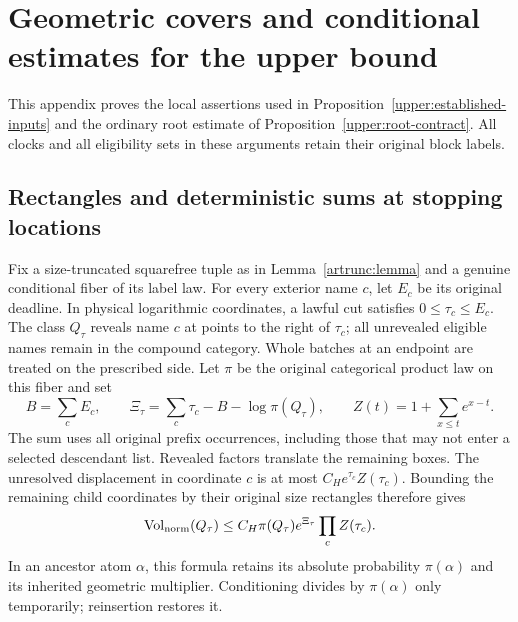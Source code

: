 \section{Geometric covers and conditional estimates for the upper bound}
\label{app:upper-details}

This appendix proves the local assertions used in
Proposition~\ref{upper:established-inputs} and the ordinary root estimate
of Proposition~\ref{upper:root-contract}. All clocks and all eligibility
sets in these arguments retain their original block labels.

\subsection{Rectangles and deterministic sums at stopping locations}
\label{updetail:rectangles}
Fix a size-truncated squarefree tuple as in Lemma~\ref{artrunc:lemma}
and a genuine conditional fiber of its label law. For every exterior
name $c$, let $E_c$ be its original deadline. In physical logarithmic
coordinates, a lawful cut satisfies $0\leq\tau_c\leq E_c$.
The class $Q_\tau$ reveals name $c$ at points to the right of $\tau_c$;
all unrevealed eligible names remain in the compound category. Whole
batches at an endpoint are treated on the prescribed side. Let $\pi$
be the original categorical product law on this fiber and set
\[
 B=\sum_cE_c,\qquad
 \Xi_\tau=\sum_c\tau_c-B-\log\pi(Q_\tau),\qquad
 Z(t)=1+\sum_{x\leq t}e^{x-t}.
\]
The sum uses all original prefix occurrences, including those that may
not enter a selected descendant list. Revealed factors translate the
remaining boxes. The unresolved displacement in coordinate $c$ is at
most $C_He^{\tau_c}Z(\tau_c)$. Bounding the remaining child coordinates
by their original size rectangles therefore gives
\begin{equation}
 \operatorname{Vol}_{\rm norm}(Q_\tau)
 \leq C_H\pi(Q_\tau)e^{\Xi_\tau}\prod_c Z(\tau_c).
 \label{updetail:rectangle}
\end{equation}
In an ancestor atom $\alpha$, this formula retains its absolute
probability $\pi(\alpha)$ and its inherited geometric multiplier.
Conditioning divides by $\pi(\alpha)$ only temporarily; reinsertion
restores it.

